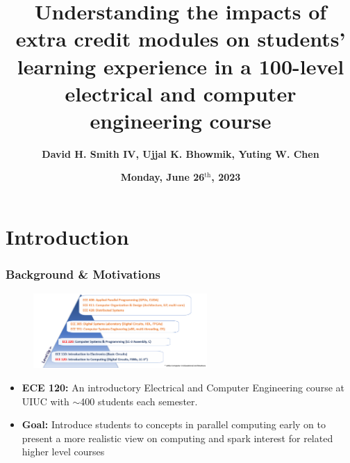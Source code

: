 \documentclass{beamer}
\title[Impacts of EC]{\textbf{Understanding the impacts of extra credit modules on students’ learning experience in a 100-level electrical and computer engineering course}}
\author[D.H Smith IV \textit{et al.}]{\textbf{David H. Smith IV, Ujjal K. Bhowmik, Yuting W. Chen}}
\institute[\textbf{UIUC}]{\textbf{University of Illinois Urbana-Champaign}}
\date{\textbf{Monday, June 26$^{\text{th}}$, 2023}}
\begin{document}
\frame{\titlepage}

\section{Introduction}

\begin{frame}
  \frametitle{Background \& Motivations}

  \begin{figure}
      \centering
      \includegraphics[width=250px]{courses.png}
  \end{figure}
  \vfill
  \begin{itemize}
    \item \textbf{ECE 120:} An introductory Electrical and Computer Engineering course at UIUC with $\sim$400 students each semester.
    \item \textbf{Goal:} Introduce students to concepts in parallel computing early on to present a more realistic view on computing and spark interest for related higher level courses
  \end{itemize}
\end{frame}
\end{document}
